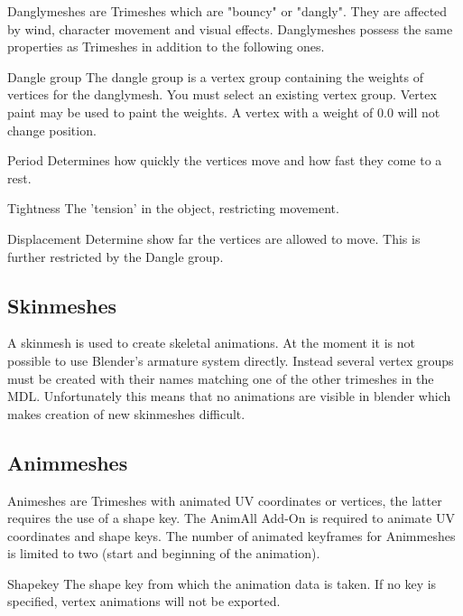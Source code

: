 Danglymeshes are Trimeshes which are "bouncy" or "dangly". They are affected by
wind, character movement and visual effects. Danglymeshes possess the same 
properties as Trimeshes in addition to the following ones.

\begin{propertyAurora}{Dangle group} 
The dangle group is a vertex group containing the weights of vertices for the danglymesh. 
You must select an existing vertex group. Vertex paint may be used to paint the weights. A vertex with a weight of
0.0 will not change position.
\end{propertyAurora}

\begin{propertyAurora}{Period} 
Determines how quickly the vertices move and how fast they come to a rest.
\end{propertyAurora}
\begin{propertyAurora}{Tightness} 
The 'tension' in the object, restricting movement. 
\end{propertyAurora}
\begin{propertyAurora}{Displacement} 
Determine show far the vertices are allowed to move. This is further restricted by the Dangle group.
\end{propertyAurora}


\subsection{Skinmeshes}
A skinmesh is used to create skeletal animations. At the moment it is not 
possible to use Blender's armature system directly. Instead several vertex groups 
must be created with their names matching one of the other trimeshes in the MDL. 
Unfortunately this means that no animations are visible in blender which makes
creation of new skinmeshes difficult.


\subsection{Animmeshes}
Animeshes are Trimeshes with animated UV coordinates or vertices, the latter requires the use of a 
shape key. The AnimAll Add-On is required to animate UV coordinates and shape keys. The number of 
animated keyframes for Animmeshes is limited to two (start and beginning of the animation).

\begin{propertyAurora}{Shapekey} 
    The shape key from which the animation data is taken. If no key is specified, vertex animations will
    not be exported.
\end{propertyAurora}

